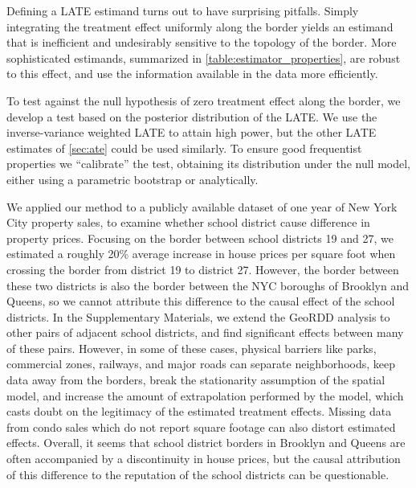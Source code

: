 Defining a LATE estimand turns out to have surprising pitfalls.
Simply integrating the treatment effect uniformly along the border yields an estimand that is inefficient and undesirably sensitive to the topology of the border.
More sophisticated estimands, summarized in \autoref{table:estimator_properties}, are robust to this effect, and use the information available in the data more efficiently.

To test against the null hypothesis of zero treatment effect along the border, we develop a test based on the posterior distribution of the LATE.
We use the inverse-variance weighted LATE to attain high power, but the other LATE estimates of \autoref{sec:ate} could be used similarly.
To ensure good frequentist properties we “calibrate” the test, obtaining its distribution under the null model, either using a parametric bootstrap or analytically.

We applied our method to a publicly available dataset of one year of New York City property sales, to examine whether school district cause difference in property prices.
Focusing on the border between school districts 19 and 27, we estimated a roughly 20\% average increase in house prices per square foot when crossing the border from district 19 to district 27.
However, the border between these two districts is also the border between the NYC boroughs of Brooklyn and Queens, so we cannot attribute this difference to the causal effect of the school districts.
In the Supplementary Materials, we extend the GeoRDD analysis to other pairs of adjacent school districts, and find significant effects between many of these pairs.
However, in some of these cases, physical barriers like parks, commercial zones, railways, and major roads can separate neighborhoods, keep data away from the borders, break the stationarity assumption of the spatial model, and increase the amount of extrapolation performed by the model, which casts doubt on the legitimacy of the estimated treatment effects.
Missing data from condo sales which do not report square footage can also distort estimated effects.
Overall, it seems that school district borders in Brooklyn and Queens are often accompanied by a discontinuity in house prices, but the causal attribution of this difference to the reputation of the school districts can be questionable.

